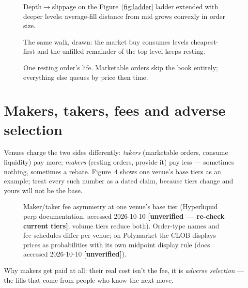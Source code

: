 \begin{figure}[ht]\centering

\caption{Depth$\to$slippage on the Figure~\ref{fig:ladder} ladder
extended with deeper levels: average-fill distance from mid grows
convexly in order size.}
\label{fig:slip}
\end{figure}

\begin{figure}[ht]\centering

\caption{The same walk, drawn: the market buy consumes levels
cheapest-first and the unfilled remainder of the top level keeps
resting.}
\label{fig:walk}
\end{figure}

\begin{figure}[ht]\centering

\caption{One resting order's life. Marketable orders skip the book
entirely; everything else queues by price then time.}
\label{fig:state}
\end{figure}

\section{Makers, takers, fees and adverse selection}\label{sec:makers}
Venues charge the two sides differently: \emph{takers} (marketable
orders, consume liquidity) pay more; \emph{makers} (resting orders,
provide it) pay less --- sometimes nothing, sometimes a rebate.
Figure~\ref{fig:fees} shows one venue's base tiers as an example;
treat every such number as a dated claim, because tiers change and
yours will not be the base.

\begin{figure}[ht]\centering

\caption{Maker/taker fee asymmetry at one venue's base tier
(Hyperliquid perp documentation, accessed 2026-10-10
\textbf{[unverified --- re-check current tiers]}; volume tiers reduce
both). Order-type names and fee schedules differ per venue; on
Polymarket the CLOB displays prices as probabilities with its own
midpoint display rule (docs accessed 2026-10-10 \textbf{[unverified]}).}
\label{fig:fees}
\end{figure}

Why makers get paid at all: their real cost isn't the fee, it is
\emph{adverse selection} --- the fills that come from people who
know the next move.

